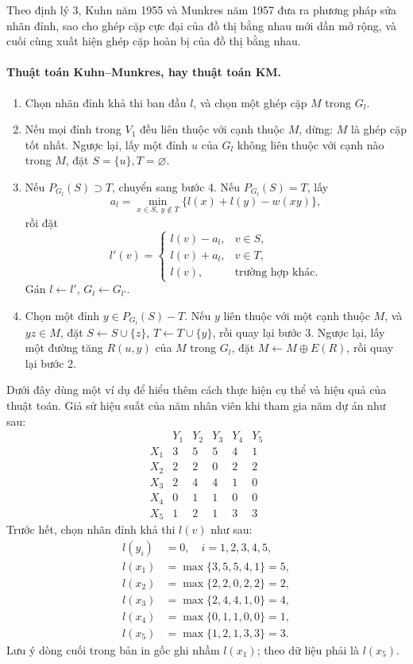 \documentclass[11pt]{article}
\begin{document}
Theo định lý 3, Kuhn năm 1955 và Munkres năm 1957 đưa ra phương pháp sửa
nhãn đỉnh, sao cho ghép cặp cực đại của đồ thị bằng nhau mới dần mở rộng, và
cuối cùng xuất hiện ghép cặp hoàn bị của đồ thị bằng nhau.

\paragraph{Thuật toán Kuhn--Munkres, hay thuật toán KM.}
\begin{enumerate}
  \item Chọn nhãn đỉnh khả thi ban đầu \(l\), và chọn một ghép cặp \(M\)
  trong \(G_l\).
  \item Nếu mọi đỉnh trong \(V_1\) đều liên thuộc với cạnh thuộc \(M\), dừng:
  \(M\) là ghép cặp tốt nhất. Ngược lại, lấy một đỉnh \(u\) của \(G_l\)
  không liên thuộc với cạnh nào trong \(M\), đặt \(S=\{u\}, T=\varnothing\).
  \item Nếu \(P_{G_l}(S)\supset T\), chuyển sang bước 4. Nếu
  \(P_{G_l}(S)=T\), lấy
  \[
    a_l=\min_{x\in S,\ y\notin T}\{l(x)+l(y)-w(xy)\},
  \]
  rồi đặt
  \[
  l'(v)=
  \begin{cases}
  l(v)-a_l, & v\in S,\\
  l(v)+a_l, & v\in T,\\
  l(v), & \text{trường hợp khác}.
  \end{cases}
  \]
  Gán \(l\leftarrow l'\), \(G_l\leftarrow G_{l'}\).
  \item Chọn một đỉnh \(y\in P_{G_l}(S)-T\). Nếu \(y\) liên thuộc với một
  cạnh thuộc \(M\), và \(yz\in M\), đặt
  \(S\leftarrow S\cup\{z\}\), \(T\leftarrow T\cup\{y\}\), rồi quay lại bước
  3. Ngược lại, lấy một đường tăng \(R(u,y)\) của \(M\) trong \(G_l\), đặt
  \(M\leftarrow M\oplus E(R)\), rồi quay lại bước 2.
\end{enumerate}

Dưới đây dùng một ví dụ để hiểu thêm cách thực hiện cụ thể và hiệu quả của
thuật toán. Giả sử hiệu suất của năm nhân viên khi tham gia năm dự án như
sau:
\[
\begin{array}{c|ccccc}
 & Y_1 & Y_2 & Y_3 & Y_4 & Y_5\\ \hline
X_1 & 3 & 5 & 5 & 4 & 1\\
X_2 & 2 & 2 & 0 & 2 & 2\\
X_3 & 2 & 4 & 4 & 1 & 0\\
X_4 & 0 & 1 & 1 & 0 & 0\\
X_5 & 1 & 2 & 1 & 3 & 3
\end{array}
\]
Trước hết, chọn nhãn đỉnh khả thi \(l(v)\) như sau:
\[
\begin{aligned}
l(y_i)&=0,\quad i=1,2,3,4,5,\\
l(x_1)&=\max\{3,5,5,4,1\}=5,\\
l(x_2)&=\max\{2,2,0,2,2\}=2,\\
l(x_3)&=\max\{2,4,4,1,0\}=4,\\
l(x_4)&=\max\{0,1,1,0,0\}=1,\\
l(x_5)&=\max\{1,2,1,3,3\}=3.
\end{aligned}
\]
Lưu ý dòng cuối trong bản in gốc ghi nhầm \(l(x_1)\); theo dữ liệu phải là
\(l(x_5)\).
\end{document}
